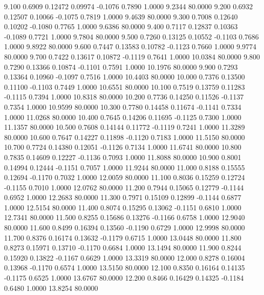    9.100   0.6909   0.12472   0.09974  -0.1076   0.7890   1.0000   9.2344  80.0000
   9.200   0.6932   0.12507   0.10066  -0.1075   0.7819   1.0000   9.4639  80.0000
   9.300   0.7008   0.12640   0.10202  -0.1080   0.7765   1.0000   9.6386  80.0000
   9.400   0.7117   0.12837   0.10363  -0.1089   0.7721   1.0000   9.7804  80.0000
   9.500   0.7260   0.13125   0.10552  -0.1103   0.7686   1.0000   9.8922  80.0000
   9.600   0.7447   0.13583   0.10782  -0.1123   0.7660   1.0000   9.9774  80.0000
   9.700   0.7422   0.13617   0.10872  -0.1119   0.7641   1.0000  10.0384  80.0000
   9.800   0.7290   0.13366   0.10874  -0.1101   0.7591   1.0000  10.1976  80.0000
   9.900   0.7293   0.13364   0.10960  -0.1097   0.7516   1.0000  10.4403  80.0000
  10.000   0.7376   0.13500   0.11100  -0.1103   0.7449   1.0000  10.6551  80.0000
  10.100   0.7519   0.13759   0.11283  -0.1115   0.7394   1.0000  10.8318  80.0000
  10.200   0.7736   0.14250   0.11526  -0.1137   0.7354   1.0000  10.9599  80.0000
  10.300   0.7780   0.14458   0.11674  -0.1141   0.7334   1.0000  11.0268  80.0000
  10.400   0.7645   0.14206   0.11695  -0.1125   0.7300   1.0000  11.1357  80.0000
  10.500   0.7608   0.14144   0.11772  -0.1119   0.7241   1.0000  11.3289  80.0000
  10.600   0.7647   0.14227   0.11898  -0.1120   0.7183   1.0000  11.5150  80.0000
  10.700   0.7724   0.14380   0.12051  -0.1126   0.7134   1.0000  11.6741  80.0000
  10.800   0.7835   0.14609   0.12227  -0.1136   0.7093   1.0000  11.8088  80.0000
  10.900   0.8001   0.14994   0.12444  -0.1151   0.7057   1.0000  11.9244  80.0000
  11.000   0.8188   0.15555   0.12694  -0.1170   0.7032   1.0000  12.0059  80.0000
  11.100   0.8036   0.15259   0.12724  -0.1155   0.7010   1.0000  12.0762  80.0000
  11.200   0.7944   0.15065   0.12779  -0.1144   0.6952   1.0000  12.2683  80.0000
  11.300   0.7971   0.15109   0.12899  -0.1144   0.6877   1.0000  12.5154  80.0000
  11.400   0.8074   0.15295   0.13062  -0.1151   0.6810   1.0000  12.7341  80.0000
  11.500   0.8255   0.15686   0.13276  -0.1166   0.6758   1.0000  12.9040  80.0000
  11.600   0.8499   0.16394   0.13560  -0.1190   0.6729   1.0000  12.9998  80.0000
  11.700   0.8376   0.16174   0.13632  -0.1179   0.6715   1.0000  13.0448  80.0000
  11.800   0.8273   0.15971   0.13710  -0.1170   0.6684   1.0000  13.1494  80.0000
  11.900   0.8244   0.15920   0.13822  -0.1167   0.6629   1.0000  13.3319  80.0000
  12.000   0.8278   0.16004   0.13968  -0.1170   0.6574   1.0000  13.5150  80.0000
  12.100   0.8350   0.16164   0.14135  -0.1175   0.6525   1.0000  13.6767  80.0000
  12.200   0.8466   0.16429   0.14325  -0.1184   0.6480   1.0000  13.8254  80.0000
